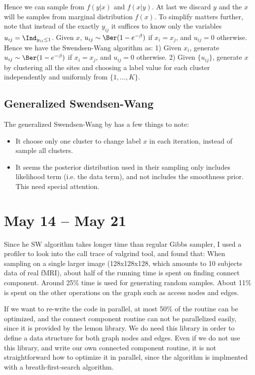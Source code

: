 \documentclass[12pt]{article}
\begin{document}
Hence we can sample from $f(y|x)$ and $f(x|y)$. At last we discard $y$ and the
$x$ will be samples from marginal distribution $f(x)$. To simplify matters
further, note that instead of the exactly $y_{ij}$ it suffices to know only the
variables $u_{ij} = \Ind_{y_{ij} \leq 1}$. Given $x$, $u_{ij}\sim \Ber(1 -
e^{-\beta})$ if $x_i = x_j$, and $u_{ij} = 0$ otherwise. Hence we have the
Swendsen-Wang algorithm as: 1) Given $x_i$, generate $u_{ij} \sim \Ber(1 -
e^{-\beta})$ if $x_i = x_j$, and $u_{ij} = 0$ otherwise. 2) Given $\{u_{ij}\}$,
generate $x$ by clustering all the sites and choosing a label value for each
cluster independently and uniformly from $\{1,\dots, K\}$.


\subsection{Generalized Swendsen-Wang}
The generalized Swendsen-Wang by \cite{barbu2005generalizing} has a few things to note:
\begin{itemize}
\item It choose only one cluster to change label $x$ in each iteration, instead of sample all clusters.
\item It seems the posterior distribution used in their sampling only includes likelihood term (i.e. the data term), and not includes the smoothness prior. This need special attention. 
\end{itemize}

\section{May 14 -- May 21}
Since he SW algorithm takes longer time than regular Gibbs sampler, I used a
profiler to look into the call trace of valgrind tool, and found that: When
sampling on a single larger image (128x128x128, which amounts to 10 subjects
data of real fMRI), about half of the running time is spent on finding connect
component. Around 25\% time is used for generating random samples. About 11\% is
spent on the other operations on the graph such as access nodes and edges.

If we want to re-write the code in parallel, at most 50\% of the routine can be
optimized, and the connect component routine can not be parallelized easily,
since it is provided by the \textsf{lemon} library. We do need this library in
order to define a data structure for both graph nodes and edges. Even if we do
not use this library, and write our own connected component routine, it is not
straightforward how to optimize it in parallel, since the algorithm is
implmented with a breath-first-search algorithm.
\end{document}
